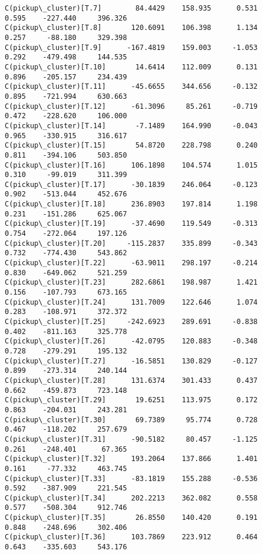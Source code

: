 \documentclass[11pt]{article}
\begin{document}
\begin{Verbatim}[commandchars=\\\{\}]
C(pickup\_cluster)[T.7]        84.4429    158.935      0.531      0.595    -227.440     396.326
C(pickup\_cluster)[T.8]       120.6091    106.398      1.134      0.257     -88.180     329.398
C(pickup\_cluster)[T.9]      -167.4819    159.003     -1.053      0.292    -479.498     144.535
C(pickup\_cluster)[T.10]       14.6414    112.009      0.131      0.896    -205.157     234.439
C(pickup\_cluster)[T.11]      -45.6655    344.656     -0.132      0.895    -721.994     630.663
C(pickup\_cluster)[T.12]      -61.3096     85.261     -0.719      0.472    -228.620     106.000
C(pickup\_cluster)[T.14]       -7.1489    164.990     -0.043      0.965    -330.915     316.617
C(pickup\_cluster)[T.15]       54.8720    228.798      0.240      0.811    -394.106     503.850
C(pickup\_cluster)[T.16]      106.1898    104.574      1.015      0.310     -99.019     311.399
C(pickup\_cluster)[T.17]      -30.1839    246.064     -0.123      0.902    -513.044     452.676
C(pickup\_cluster)[T.18]      236.8903    197.814      1.198      0.231    -151.286     625.067
C(pickup\_cluster)[T.19]      -37.4690    119.549     -0.313      0.754    -272.064     197.126
C(pickup\_cluster)[T.20]     -115.2837    335.899     -0.343      0.732    -774.430     543.862
C(pickup\_cluster)[T.22]      -63.9011    298.197     -0.214      0.830    -649.062     521.259
C(pickup\_cluster)[T.23]      282.6861    198.987      1.421      0.156    -107.793     673.165
C(pickup\_cluster)[T.24]      131.7009    122.646      1.074      0.283    -108.971     372.372
C(pickup\_cluster)[T.25]     -242.6923    289.691     -0.838      0.402    -811.163     325.778
C(pickup\_cluster)[T.26]      -42.0795    120.883     -0.348      0.728    -279.291     195.132
C(pickup\_cluster)[T.27]      -16.5851    130.829     -0.127      0.899    -273.314     240.144
C(pickup\_cluster)[T.28]      131.6374    301.433      0.437      0.662    -459.873     723.148
C(pickup\_cluster)[T.29]       19.6251    113.975      0.172      0.863    -204.031     243.281
C(pickup\_cluster)[T.30]       69.7389     95.774      0.728      0.467    -118.202     257.679
C(pickup\_cluster)[T.31]      -90.5182     80.457     -1.125      0.261    -248.401      67.365
C(pickup\_cluster)[T.32]      193.2064    137.866      1.401      0.161     -77.332     463.745
C(pickup\_cluster)[T.33]      -83.1819    155.288     -0.536      0.592    -387.909     221.545
C(pickup\_cluster)[T.34]      202.2213    362.082      0.558      0.577    -508.304     912.746
C(pickup\_cluster)[T.35]       26.8550    140.420      0.191      0.848    -248.696     302.406
C(pickup\_cluster)[T.36]      103.7869    223.912      0.464      0.643    -335.603     543.176

\end{Verbatim}
\end{document}

